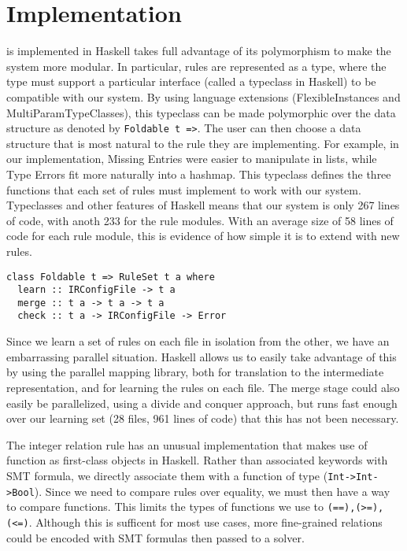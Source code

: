 \section{Implementation}

\app is implemented in Haskell takes full advantage of its polymorphism to make the system more modular.
In particular, rules are represented as a type, where the type must support a particular interface (called a typeclass in Haskell) to be compatible with our system.
By using language extensions (FlexibleInstances and MultiParamTypeClasses), this typeclass can be made polymorphic over the data structure as denoted by \lstinline{Foldable t =>}.
The user can then choose a data structure that is most natural to the rule they are implementing.
For example, in our implementation, Missing Entries were easier to manipulate in lists, while Type Errors fit more naturally into a hashmap.
This typeclass defines the three functions that each set of rules must implement to work with our system.
Typeclasses and other features of Haskell means that our system is only 267 lines of code, with anoth 233 for the rule modules.
With an average size of 58 lines of code for each rule module, this is evidence of how simple it is to extend \app with new rules.

\begin{lstlisting}
class Foldable t => RuleSet t a where
  learn :: IRConfigFile -> t a
  merge :: t a -> t a -> t a
  check :: t a -> IRConfigFile -> Error
\end{lstlisting}

Since we learn a set of rules on each file in isolation from the other, we have an embarrassing parallel situation.
Haskell allows us to easily take advantage of this by using the parallel mapping library\cite{}, both for translation to the intermediate representation, and for learning the rules on each file.
The merge stage could also easily be parallelized, using a divide and conquer approach, but \app runs fast enough over our learning set (28 files, 961 lines of code) that this has not been necessary.

The integer relation rule has an unusual implementation that makes use of function as first-class objects in Haskell.
Rather than associated keywords with SMT formula, we directly associate them with a function of type (\lstinline{Int->Int->Bool}).
Since we need to compare rules over equality, we must then have a way to compare functions.
This limits the types of functions we use to \lstinline{(==),(>=),(<=)}.
Although this is sufficent for most use cases, more fine-grained relations could be encoded with SMT formulas then passed to a solver.


